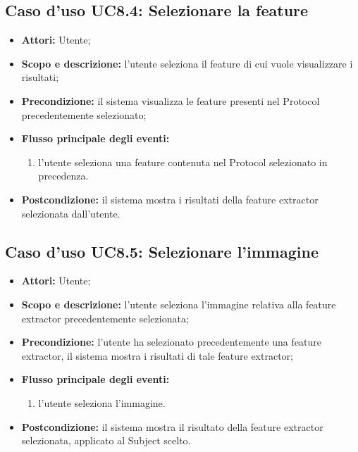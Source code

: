\subsection{Caso d'uso UC8.4: Selezionare la feature}
\begin{itemize}
\item \textbf{Attori:} Utente;
\item \textbf{Scopo e descrizione:} l'utente seleziona il feature\glossario{} di cui vuole visualizzare i risultati;
\item \textbf{Precondizione:} il sistema visualizza le feature\glossario{} presenti nel Protocol\glossario{} precedentemente selezionato;
\item \textbf{Flusso principale degli eventi:}
\begin{enumerate}
\item l'utente seleziona una feature\glossario{} contenuta nel Protocol\glossario{} selezionato in precedenza.
\end{enumerate}
\item \textbf{Postcondizione:} il sistema mostra i risultati della feature extractor\glossario{} selezionata dall'utente.
\end{itemize}

\subsection{Caso d'uso UC8.5: Selezionare l'immagine}
\begin{itemize}
\item \textbf{Attori:} Utente;
\item \textbf{Scopo e descrizione:} l'utente seleziona l'immagine relativa alla feature extractor\glossario{} precedentemente selezionata;
\item \textbf{Precondizione:} l'utente ha selezionato precedentemente una feature extractor\glossario{}, il sistema mostra i risultati di tale feature extractor\glossario{};
\item \textbf{Flusso principale degli eventi:}
\begin{enumerate}
\item l'utente seleziona l'immagine.
\end{enumerate}
\item \textbf{Postcondizione:} il sistema mostra il risultato della feature extractor\glossario{} selezionata, applicato al Subject\glossario{} scelto.
\end{itemize}

\pagebreak

